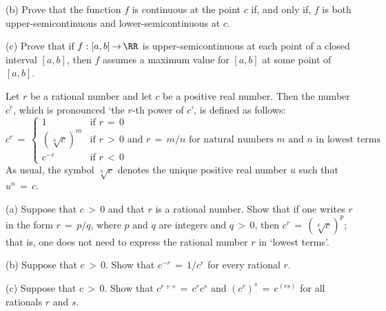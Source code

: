         (b) Prove that the function $f$ is continuous at the point $c$ if, and only if, $f$ is both upper-semicontinuous and lower-semicontinuous at $c$.

\V

        (c) Prove that if $f:[a,b] \,{\rightarrow}\, {\RR}$ is upper-semicontinuous at each point of a closed interval $[a,b]$, then $f$ assumes a maximum value for $[a,b]$ at some point of $[a,b]$.

\V
\V

        
\noindent {} Let $r$ be a rational number and let $c$ be a positive real number.
    Then the number $c^{r}$, which is pronounced `the $r$-th power of $c$', is defined as follows:
        \begin{displaymath}
        c^{r} \,=\, \left\{
        \begin{array}{ll}
        1 & \mbox{if $r \,=\, 0$} \\
        \left(\sqrt[n]{c}\right)^{m} & \mbox{if $r\,>\,0$ and $r \,=\, m/n$ for natural numbers $m$ and $n$ in lowest terms} \\
        c^{-r} & \mbox{if $r\,<\,0$}
        \end{array}
                                \right.
        \end{displaymath}
    As usual, the symbol $\sqrt[n]{c}$ denotes the unique positive real number $u$ such that $u^{n} \,=\, c$.

\V

        (a) Suppose that $c\,>\,0$ and that $r$ is a rational number. Show that if one writes $r$ in the form $r \,=\, p/q$,
    where $p$ and $q$ are integers and $q\,>\,0$, then $c^{r} \,=\, \left(\sqrt[q]{c}\right)^{p}$;
    that is, one does not need to express the rational number $r$ in `lowest terms'.

\V

        (b) Suppose that $c\,>\,0$. Show that $c^{-r} \,=\, 1/c^{r}$ for every rational $r$.

\V

        (c) Suppose that $c\,>\,0$. Show that $c^{r+s} \,=\, c^{r}c^{s}$ and $\left(c^{r}\right)^{s} \,=\, c^{(rs)}$  for all rationals $r$ and $s$.
